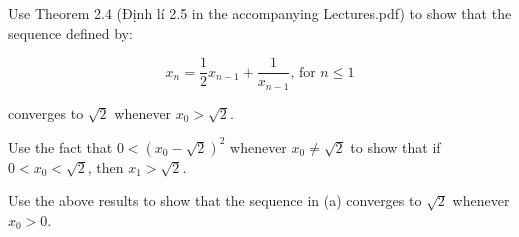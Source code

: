 \documentclass[../../../../Assignments]{subfiles}
\begin{document}
\begin{exercise}
    \begin{tasks}
        \task Use Theorem 2.4 (Định lí 2.5 in the accompanying Lectures.pdf) to
            show that the sequence defined by:

            \[x_n = \frac{1}{2} x_{n - 1} + \frac{1}{x_{n - 1}} \text{, for \(n \leq 1\)}\]

            converges to \(\sqrt{2}\) whenever \(x_0 > \sqrt{2}\).

        \task Use the fact that \(0 < (x_0 - \sqrt{2})^2\) whenever \(x_0 \neq
            \sqrt{2}\) to show that if \(0 < x_0 < \sqrt{2}\), then \(x_1 >
            \sqrt{2}\).

        \task Use the above results to show that the sequence in (a) converges
            to \(\sqrt{2}\) whenever \(x_0 > 0\).
    \end{tasks}
\end{exercise}
\end{document}
